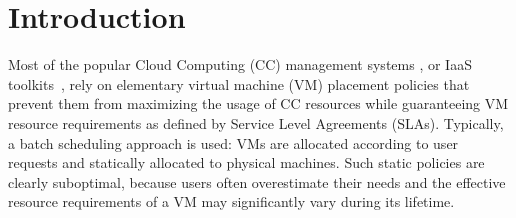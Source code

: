 \section{Introduction}
\label{sec:intro}

Most of the popular Cloud Computing (CC) management systems
\cite{cloudstack,opennebula,openstack}, or IaaS
toolkits~\cite{moreno:2012}, rely on elementary virtual machine (VM)
placement policies that prevent them from maximizing the usage
of CC resources while guaranteeing VM resource requirements as defined
by Service Level Agreements (SLAs).
Typically, a batch scheduling approach is used: VMs are allocated
according to user requests and statically allocated to physical
machines. Such static policies are clearly suboptimal, because users
often overestimate their needs and the effective resource requirements
of a VM may significantly vary during its lifetime.

